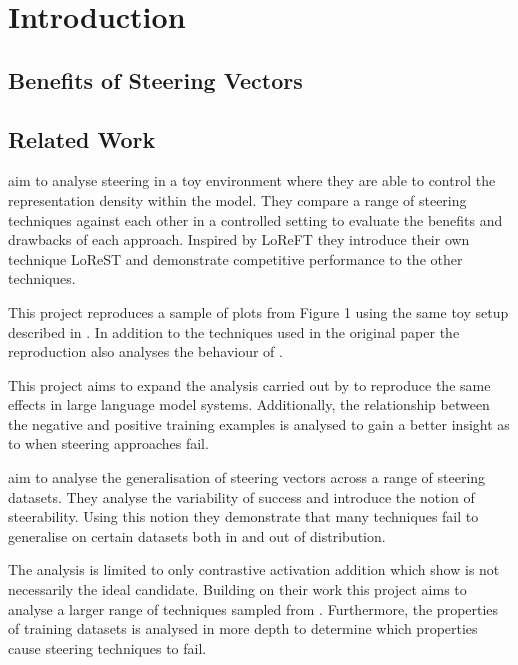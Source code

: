 \chapter{Introduction}

\section{Benefits of Steering Vectors}

\section{Related Work}

aim to analyse steering in a toy environment where they are able to control the representation density within the model.
They compare a range of steering techniques \cite{caa, reft, mimic} against each other in a controlled setting to evaluate the benefits and drawbacks of each approach.
Inspired by LoReFT \cite{reft} they introduce their own technique LoReST and demonstrate competitive performance to the other techniques.

This project reproduces a sample of plots from Figure 1 using the same toy setup described in .
In addition to the techniques used in the original paper the reproduction also analyses the behaviour of \citet{ace}.

This project aims to expand the analysis carried out by \citet{steering-clear} to reproduce the same effects in large language model systems.
Additionally, the relationship between the negative and positive training examples is analysed to gain a better insight as to when steering approaches fail.

aim to analyse the generalisation of steering vectors across a range of steering datasets.
They analyse the variability of success and introduce the notion of steerability.
Using this notion they demonstrate that many techniques fail to generalise on certain datasets both in and out of distribution.

The analysis is limited to only contrastive activation addition \cite{caa} which \citet{steering-clear} show is not necessarily the ideal candidate.
Building on their work this project aims to analyse a larger range of techniques sampled from \citet{steering-clear}.
Furthermore, the properties of training datasets is analysed in more depth to determine which properties cause steering techniques to fail.

